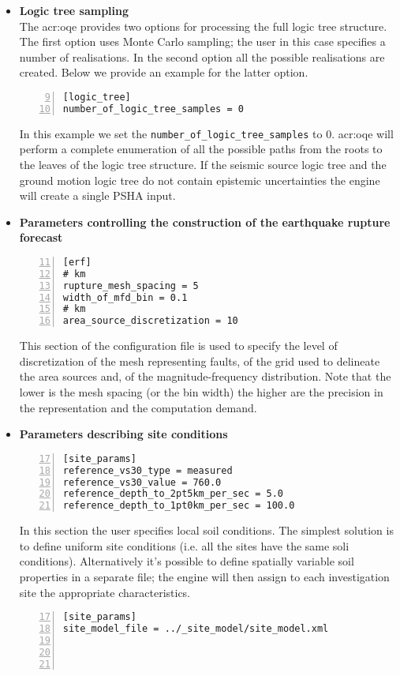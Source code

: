 \begin{itemize}
\begin{Verbatim}[frame=single, commandchars=\\\{\}, fontsize=\small,
    firstnumber=5, numbers=left, numbersep=2pt]
\end{Verbatim}
%
\item \textbf{Logic tree sampling} \hfill \\
    The \gls{acr:oqe} provides two options for processing the full 
    logic tree structure. The first option uses Monte Carlo sampling;
    the user in this case specifies a number of realisations. In the 
    second option all the possible realisations are created. Below 
    we provide an example for the latter option.
\begin{Verbatim}[frame=single, commandchars=\\\{\}, fontsize=\small,
    firstnumber=9, numbers=left, numbersep=2pt]
[logic_tree]
number_of_logic_tree_samples = 0
\end{Verbatim}
    In this example we set the \texttt{number\_of\_logic\_tree\_samples}
    to 0. \gls{acr:oqe} will perform a complete enumeration of all 
    the possible paths from the roots to the leaves of the logic tree 
    structure. If the seismic source logic tree and the ground motion
    logic tree do not contain epistemic uncertainties the engine will
    create a single PSHA input.
%
\item \textbf{Parameters controlling the construction of the earthquake 
    rupture forecast}
\begin{Verbatim}[frame=single, commandchars=\\\{\}, fontsize=\small,
    firstnumber=11, numbers=left, numbersep=2pt]
[erf]
# km
rupture_mesh_spacing = 5
width_of_mfd_bin = 0.1
# km
area_source_discretization = 10
\end{Verbatim}
This section of the configuration file is used to specify the 
level of discretization of the mesh representing faults, of the grid
used to delineate the area sources and, of the magnitude-frequency 
distribution. 
Note that the lower is the mesh spacing (or the bin width) the higher 
are the precision in the representation and the computation demand.
%
\item \textbf{Parameters describing site conditions}
\begin{Verbatim}[frame=single, commandchars=\\\{\}, fontsize=\small,
    firstnumber=17, numbers=left, numbersep=2pt]
[site_params]
reference_vs30_type = measured
reference_vs30_value = 760.0
reference_depth_to_2pt5km_per_sec = 5.0
reference_depth_to_1pt0km_per_sec = 100.0
\end{Verbatim}
In this section the user specifies local soil conditions. The simplest
solution is to define uniform site conditions (i.e. all the sites have 
the same soli conditions). Alternatively it's possible to define 
spatially variable soil properties in a separate file; the engine will
then assign to each investigation site the appropriate characteristics.
%
\begin{Verbatim}[frame=single, commandchars=\\\{\}, fontsize=\small,
    firstnumber=17, numbers=left, numbersep=2pt]
[site_params]
site_model_file = ../_site_model/site_model.xml




\end{Verbatim}
\end{itemize}
